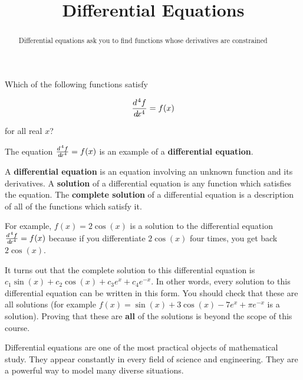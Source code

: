 \documentclass{ximera}
\title[Dig-In:]{Differential Equations}
\begin{document}
\begin{abstract}
	Differential equations ask you to find functions whose derivatives are constrained
\end{abstract}
\maketitle

\begin{question}
Which of the following functions satisfy 

\[
\frac{\mathop{}\!d\!^{ \hspace{0.8mm} 4} f}{\mathop{}\!d\! x^4} = f(x)
\]

for all real $x$?

\begin{multipleChoice}
\end{multipleChoice}

\end{question}

The equation $\frac{\mathop{}\!d\!^{ \hspace{0.8mm} 4} f}{\mathop{}\!d\! x^4} = f(x)$ is an example of a \textbf{differential equation}.  

\begin{definition}
	A \textbf{differential equation} is an equation involving an unknown function and its derivatives.  A \textbf{solution} of a differential equation is any function which satisfies the equation.  The \textbf{complete solution} of a differential equation is a description of all of the functions which satisfy it.
\end{definition}

For example, $f(x) = 2\cos(x)$ is a solution to the differential equation $\frac{\mathop{}\!d\!^{ \hspace{0.8mm} 4} f}{\mathop{}\!d\! x^4} = f(x)$ because if you differentiate $2\cos(x)$ four times, you get back $2\cos(x)$.

It turns out that the complete solution to this differential equation is $c_1\sin(x)+c_2\cos(x)+c_3e^x+c_4e^{-x}$.  In other words, every solution to this differential equation can be written in this form.  You should check that these are all solutions (for example $f(x) = \sin(x)+3\cos(x)-7e^x+\pi e^{-x}$ is a solution).  Proving that these are \textbf{all} of the solutions is beyond the scope of this course.

Differential equations are one of the most practical objects of mathematical study.  They appear constantly in every field of science and engineering.  They are a powerful way to model many diverse situations.
\end{document}

